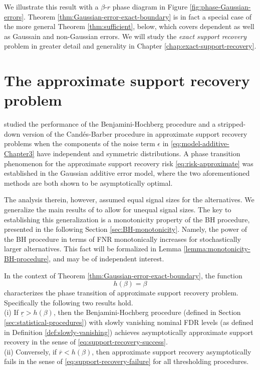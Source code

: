 We illustrate this result with a $\beta$-$r$ phase diagram in Figure \ref{fig:phase-Gaussian-errors}.  Theorem \ref{thm:Gaussian-error-exact-boundary} is in 
fact a special case of the more general Theorem \ref{thm:sufficient}, below, which covers dependent as well as Gaussain and non-Gaussian errors.  We will study the {\em exact support recovery} problem in greater detail and generality in Chapter \ref{chap:exact-support-recovery}. 


\section{The approximate support recovery problem}
\label{subsec:approx-support-recovery-Gaussian}

\cite{arias2017distribution} studied the performance of the Benjamini-Hochberg procedure \citep{benjamini1995controlling} and a stripped-down version of the Cand\'es-Barber procedure \citep{barber2015controlling} in approximate support recovery problems when the components of the noise term $\epsilon$ in \eqref{eq:model-additive-Chapter3} have independent and symmetric distributions.
A phase transition phenomenon for the approximate support recovery risk \eqref{eq:risk-approximate} was established in the Gaussian additive error model, where the two aforementioned methods are both shown to be asymptotically optimal.

The analysis therein, however, assumed equal signal sizes for the alternatives.
We generalize the main results of \citet{arias2017distribution} to allow for unequal signal sizes. 
The key to establishing this generalization is a monotonicity property of the \ac{BH} procedure, presented in the following 
Section \ref{sec:BH-monotonicity}. Namely, the power of the \ac{BH} procedure in terms of FNR monotonically increases for stochastically 
larger alternatives. This fact will be formalized in Lemma \ref{lemma:monotonicity-BH-procedure}, and may be of independent interest.


\begin{theorem} \label{thm:Gaussian-error-approx-boundary}
In the context of Theorem \ref{thm:Gaussian-error-exact-boundary}, the function 
\begin{equation} \label{eq:approx-boundary-Gaussian}
    h(\beta) = \beta
\end{equation}
characterizes the phase transition of approximate support recovery problem.  Specifically the following two results hold.\\

{\rm (i)} If $\underline{r} > {h}(\beta)$, then the Benjamini-Hochberg procedure (defined in Section \ref{sec:statistical-procedures}) with slowly 
vanishing nominal FDR levels (as defined in Definition \ref{def:slowly-vanishing}) achieves asymptotically approximate support recovery in the sense of \eqref{eq:support-recovery-success}.\\ 

{\rm (ii)}
Conversely, if $\overline{r} < {h}(\beta)$, then approximate support recovery asymptotically fails in the sense of \eqref{eq:support-recovery-failure} for all thresholding procedures.
\end{theorem}


